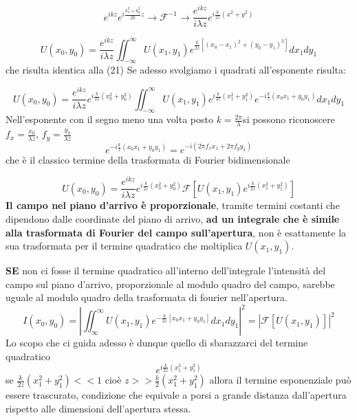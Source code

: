 \documentclass{article}
\begin{document}
\begin{equation}
e^{i k z} e^{i \frac{k_{x}^{2}+ k_{y}^{2}}{2k} z}\longrightarrow\mathscr{F}^{-1} \longrightarrow  \frac{e^{i k z}}{i \lambda z}  e^{i \frac{k}{2z} (x^{2}+ y^{2})}
\end{equation}

\begin{equation}
U(x_{0}, y_{0})= \frac{e^{i k z} }{i \lambda z}  \iint_{-\infty}^{\infty} U(x_{1}, y_{1}) e^{\frac{k}{2z} [(x_{0}- x_{1})^{2} + (y_{0}- y_{1})^{2}]}dx_{1}dy_{1}
\end{equation}
che risulta identica alla (21)
Se adesso svolgiamo i quadrati all'esponente risulta:

\begin{equation}
U(x_{0}, y_{0})= \frac{e^{i k z} }{i \lambda z}e^{i\frac{k}{2z}(x_{0}^{2}+y_{0}^2)} \iint_{-\infty}^{\infty} U(x_{1}, y_{1})e^{i\frac{k}{2z}(x_{1}^{2}+y_{1}^2)}e^{-i\frac{k}{z}(x_{0}x_{1}+y_{0}y_{1})}dx_{1}dy_{1}
\end{equation}
Nell'esponente con il segno meno una volta posto $k=\frac{2\pi}{\lambda}$si possono riconoscere
$f_{x}=\frac{x_{0}}{\lambda z}$,
$f_{y}=\frac{y_{0}}{\lambda z}$
\begin{equation}
e^{-i\frac{k}{z}(x_{0}x_{1}+y_{0}y_{1})}=e^{-i(2\pi f_{x}x_{1}+2\pi f_{y}y_{1})} 
\end{equation}
che è il classico termine della trasformata di Fourier bidimensionale

\begin{equation}
U(x_{0}, y_{0})= \frac{e^{i k z} }{i \lambda z}e^{i\frac{k}{2z}(x_{0}^{2}+y_{0}^2)}\mathscr{F}[U(x_{1}, y_{1})e^{i\frac{k}{2z}(x_{1}^{2}+y_{1}^2)}]
\end{equation}
\textbf{Il campo nel piano d'arrivo è proporzionale}, tramite termini costanti che dipendono dalle coordinate del piano di arrivo,\textbf{ ad un integrale che è simile alla trasformata di Fourier del campo sull'apertura}, non è esattamente la sua trasformata per il termine quadratico che moltiplica $U(x_{1},y_{1})$.

\textbf{SE} non ci fosse il termine quadratico all'interno dell'integrale l'intensità del campo sul piano d'arrivo, proporzionale al modulo quadro del campo, sarebbe uguale al modulo quadro della trasformata di fourier nell'apertura.
\begin{equation}
I(x_{0}, y_{0}) = |\iint_{\infty}^{\infty} U(x_{1}, y_{1}) e^{-\frac{k}{2z} [x_{0} x_{1} + y_{0} y_{1}]}dx_{1}dy_{1}|^{2} = |\mathscr{F}[U(x_{1}, y_{1})]| ^{2}
\end{equation}
Lo scopo che ci guida adesso è dunque quello di sbarazzarci del termine quadratico
\begin{equation}
e^{i \frac{k }{2z}( x_{1}^{2}  +  y_{1}^{2} )}
\end{equation}
se $\frac{k }{2z}( x_{1}^{2}  +  y_{1}^{2} )<<1$
cioè $z>>\frac{k }{2}( x_{1}^{2}  +  y_{1}^{2} )$ allora il termine esponenziale può essere trascurato, condizione che equivale a porsi a grande distanza dall'apertura rispetto alle dimensioni dell'apertura stessa.
\end{document}

